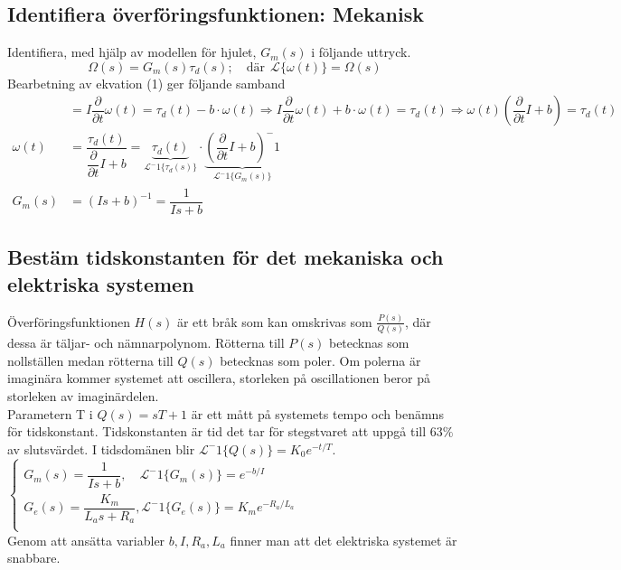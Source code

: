 \documentclass[11pt]{article}
\begin{document}
\subsection{Identifiera överföringsfunktionen: Mekanisk}
Identifiera, med hjälp av modellen för hjulet, $G_m(s)$ i följande uttryck.
$$\Omega(s)=G_m(s)\tau_d(s); \quad
\text{där} \ \ \mathcal{L}\{\omega(t)\}=\Omega(s)$$
Bearbetning av ekvation (1) ger följande samband
\begin{equation*}
\begin{split}
&=I\dfrac{\partial}{\partial t}\omega(t) = \tau_d(t)-b\cdot\omega(t) \Rightarrow
I\dfrac{\partial}{\partial t}\omega(t) +b\cdot\omega(t) = \tau_d(t) \Rightarrow \omega(t)(\dfrac{\partial}{\partial t}I+b) = \tau_d(t)\\
\omega(t)&= \dfrac{\tau_d(t)}{\dfrac{\partial}{\partial t}I+b} = \underbrace{\tau_d(t)}_{\mathcal{L}^-1\{\tau_d(s)\}}\cdot\underbrace{(\dfrac{\partial}{\partial t}I+b)^-1}_{\mathcal{L}^-1\{G_m(s)\}}\\
G_m(s)&=(Is+b)^{-1} = \dfrac{1}{Is+b}
\end{split}
\end{equation*}

\subsection{Bestäm tidskonstanten för det mekaniska och elektriska systemen}
Överföringsfunktionen $H(s)$ är ett bråk som kan omskrivas som $\frac{P(s)}{Q(s)}$, där dessa är täljar- och nämnarpolynom. Rötterna till $P(s)$ betecknas som nollställen medan rötterna till $Q(s)$ betecknas som poler. Om polerna är imaginära kommer systemet att oscillera, storleken på oscillationen beror på storleken av imaginärdelen. \\[0.5em]
Parametern T i $Q(s)=sT+1$ är ett mått på systemets tempo och benämns för tidskonstant. Tidskonstanten är tid det tar för stegstvaret att uppgå till $63\%$ av slutsvärdet. I tidsdomänen blir ${\mathcal{L}}^-1\{Q(s)\} = K_0e^{-t/T}$.\\[1em]
$
\begin{cases}
G_m(s)= \dfrac{1}{Is+b}, \quad {\mathcal{L}}^-1\{G_m(s)\} = e^{-b/I}    \\[1em]
G_e(s)= \dfrac{K_m}{L_as+R_a}, {\mathcal{L}}^-1\{G_e(s)\} = K_me^{-R_a/L_a}\\
\end{cases}
$\\[0.5em]
Genom att ansätta variabler $b,I,R_a,L_a$ finner man att det elektriska systemet är snabbare.
\end{document}
